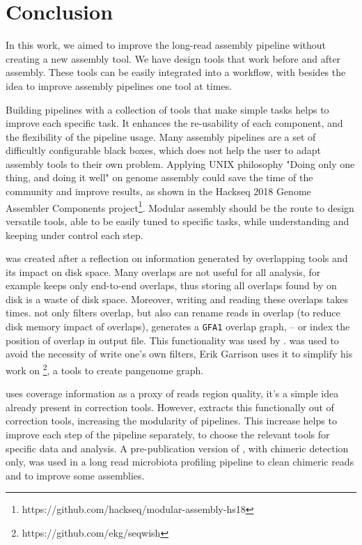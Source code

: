 \documentclass[main.tex]{subfiles}
\begin{document}
\chapter{Conclusion}

In this work, we aimed to improve the long-read assembly pipeline without creating a new assembly tool. We have design tools that work before and after assembly. These tools can be easily integrated into a workflow, with besides the idea to improve assembly pipelines one tool at times.

Building pipelines with a collection of tools that make simple tasks helps to improve each specific task. It enhances the re-usability of each component, and the flexibility of the pipeline usage. Many assembly pipelines are a set of difficultly configurable black boxes, which does not help the user to adapt assembly tools to their own problem. Applying UNIX philosophy "Doing only one thing, and doing it well" on genome assembly could save the time of the community and improve results, as shown in the Hackseq 2018 Genome Assembler Components project\footnote{https://github.com/hackseq/modular-assembly-hs18}. Modular assembly should be the route to design versatile tools, able to be easily tuned to specific tasks, while understanding and keeping under control each step.

\fpa was created after a reflection on information generated by overlapping tools and its impact on disk space. Many overlaps are not useful for all analysis, for example \miniasm keeps only end-to-end overlaps, thus storing all overlaps found by \minimap on disk is a waste of disk space. Moreover, writing and reading these overlaps takes times. \fpa not only filters overlap, but also can rename reads in overlap (to reduce disk memory impact of overlaps), generates a \texttt{GFA1} overlap graph, -- or index the position of overlap in output file. This functionality was used by \consent \cite{CONSENT}. \fpa was used to avoid the necessity of write one's own filters, Erik Garrison uses it to simplify his work on \footnote{https://github.com/ekg/seqwish}, a tools to create pangenome graph.

\yacrd uses coverage information as a proxy of reads region quality, it's a simple idea already present in correction tools. However, \yacrd extracts this functionally out of correction tools, increasing the modularity of pipelines. This increase helps to improve each step of the pipeline separately, to choose the relevant tools for specific data and analysis. A pre-publication version of \yacrd, with chimeric detection only, was used in a long read microbiota profiling pipeline to clean chimeric reads \cite{cite_yacrd} and to improve some \flye assemblies. 
\end{document}
